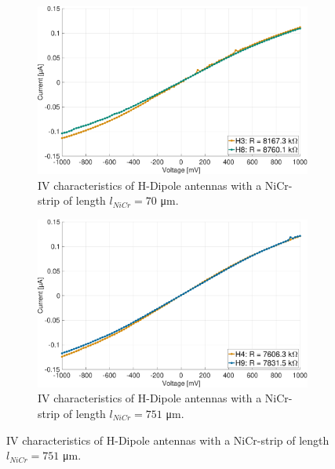 \begin{figure}[ht]
    \begin{subfigure}[b]{0.49\textwidth}
        \centering
        \includegraphics[width=\textwidth]{figures/IV_v2/IV_H3_H8.pdf}
        \caption{IV characteristics of H-Dipole antennas with a NiCr-strip of length $l_{NiCr} = 70$ \si{\micro \meter}.}
        \label{fig:sub3}
    \end{subfigure}
    \hfill
    \begin{subfigure}[b]{0.49\textwidth}
        \centering
        \includegraphics[width=\textwidth]{figures/IV_v2/IV_H4_H9.pdf}
        \caption{IV characteristics of H-Dipole antennas with a NiCr-strip of length $l_{NiCr} = 751$ \si{\micro \meter}.}
        \label{fig:sub4}
    \end{subfigure}
    
    \vspace{1em} %


\end{figure}
